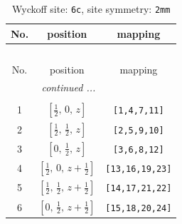 \documentclass[fleqn,8pt]{jsarticle}
\begin{document}
\renewcommand{\arraystretch}{1.2}
\begin{longtable}{ccc}
\caption{Wyckoff site: {\tt 6c}, site symmetry: {\tt 2mm}}
 \\
 \hline \hline
No. & position & mapping \\ \hline \endfirsthead

\multicolumn{2}{l}{\tablename\ \thetable{}} \\
 \hline \hline
No. & position & mapping \\ \hline \endhead

 \hline \hline
\multicolumn{2}{r}{\footnotesize\it continued ...} \\ \endfoot

 \hline \hline
\multicolumn{2}{r}{} \\ \endlastfoot

1 & $\left[ \frac{1}{2},\, 0,\, z \right]$ & {\tt [1,4,7,11]} \\ \hline
2 & $\left[ \frac{1}{2},\, \frac{1}{2},\, z \right]$ & {\tt [2,5,9,10]} \\ \hline
3 & $\left[ 0,\, \frac{1}{2},\, z \right]$ & {\tt [3,6,8,12]} \\ \hline
4 & $\left[ \frac{1}{2},\, 0,\, z + \frac{1}{2} \right]$ & {\tt [13,16,19,23]} \\ \hline
5 & $\left[ \frac{1}{2},\, \frac{1}{2},\, z + \frac{1}{2} \right]$ & {\tt [14,17,21,22]} \\ \hline
6 & $\left[ 0,\, \frac{1}{2},\, z + \frac{1}{2} \right]$ & {\tt [15,18,20,24]} \\
\end{longtable}
\renewcommand{\arraystretch}{1.2}
\end{document}
